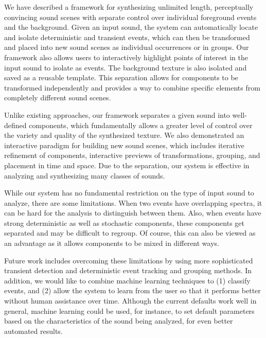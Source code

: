 \documentclass{acmsiggraph}               %
\begin{document}
We have described a framework for synthesizing unlimited length, perceptually convincing 
sound scenes with separate control over individual foreground events and the background.  
Given an input sound, the system can automatically locate and isolate deterministic 
and transient events, which can then be transformed and placed into new sound scenes 
as individual occurrences or in groups.  Our framework 
also allows users to interactively highlight points of interest in the input 
sound to isolate as 
events.  The background texture is also isolated and saved as a reusable template. This 
separation allows for components to be transformed independently and provides a way to 
combine specific elements from completely different sound scenes.

Unlike existing approaches, our framework separates a given sound into well-defined 
components, which fundamentally allows a greater 
level of control over the variety and quality of the synthesized texture.
We also demonstrated an interactive paradigm for building new sound scenes, which includes 
iterative refinement of components, interactive previews of transformations, 
grouping, and placement 
in time and space.  Due to the separation, our system is effective in analyzing and 
synthesizing many classes of sounds. %

While our system has no fundamental restriction on the type of input sound to analyze,
there are some limitations. When two events have overlapping spectra, it can be hard for the
analysis to distinguish between them. Also, when events have strong deterministic as well as 
stochastic components, these components get separated and may be difficult to regroup. 
Of course, this can also be viewed as an advantage as it allows components to be 
mixed in different ways. 

Future work includes overcoming these limitations by using more sophisticated transient 
detection and deterministic 
event tracking and grouping methods. In addition, we would like to combine machine 
learning techniques 
to (1) classify events, and (2) allow the system to learn from the user so that 
it performs better without human assistance over time. Although the current defaults 
work well in general, machine learning could be used, for instance, to set 
default parameters based on the characteristics of the sound being analyzed, 
for even better automated results. 
\end{document}
